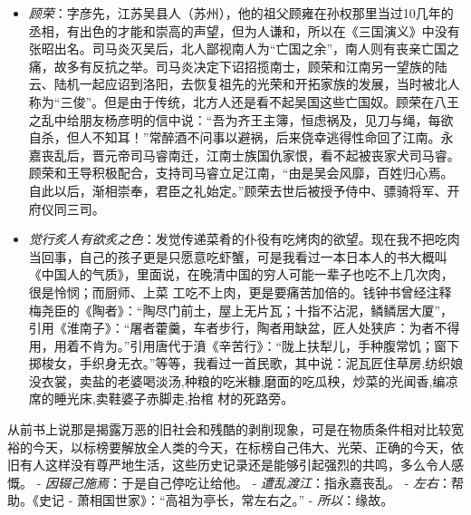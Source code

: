 \documentclass[]{book}
\providecommand{\tightlist}{%
  \setlength{\itemsep}{0pt}\setlength{\parskip}{0pt}}
\begin{document}
\begin{itemize}
\tightlist
\item
  \emph{顾荣}：字彦先，江苏吴县人（苏州），他的祖父顾雍在孙权那里当过10几年的丞相，有出色的才能和崇高的声望，但为人谦和，所以在《三国演义》中没有张昭出名。司马炎灭吴后，北人鄙视南人为``亡国之余''，南人则有丧亲亡国之痛，故多有反抗之举。司马炎决定下诏招揽南士，顾荣和江南另一望族的陆云、陆机一起应诏到洛阳，去恢复祖先的光荣和开拓家族的发展，当时被北人称为``三俊''。但是由于传统，北方人还是看不起吴国这些亡国奴。顾荣在八王之乱中给朋友杨彦明的信中说：``吾为齐王主簿，恒虑祸及，见刀与绳，每欲自杀，但人不知耳！''常醉酒不问事以避祸，后来侥幸逃得性命回了江南。永嘉丧乱后，晋元帝司马睿南迁，江南士族国仇家恨，看不起被丧家犬司马睿。顾荣和王导积极配合，支持司马睿立足江南，``由是吴会风靡，百姓归心焉。自此以后，渐相崇奉，君臣之礼始定。''顾荣去世后被授予侍中、骠骑将军、开府仪同三司。
\item
  \emph{觉行炙人有欲炙之色}：发觉传递菜肴的仆役有吃烤肉的欲望。现在我不把吃肉当回事，自己的孩子更是只愿意吃虾蟹，可是我看过一本日本人的书大概叫《中国人的气质》，里面说，在晚清中国的穷人可能一辈子也吃不上几次肉，很是怜悯；而厨师、上菜
  工吃不上肉，更是要痛苦加倍的。钱钟书曾经注释梅尧臣的《陶者》：``陶尽门前土，屋上无片瓦；十指不沾泥，鳞鳞居大厦''，引用《淮南子》：``屠者藿羹，车者步行，陶者用缺盆，匠人处狭庐：为者不得用，用着不肯为。''引用唐代于濆《辛苦行》：``陇上扶犁儿，手种腹常饥；窗下掷梭女，手织身无衣。''等等，我看过一首民歌，其中说：泥瓦匠住草房,纺织娘没衣裳，卖盐的老婆喝淡汤,种粮的吃米糠,磨面的吃瓜秧，炒菜的光闻香,编凉席的睡光床,卖鞋婆子赤脚走,抬棺
  材的死路旁。
\end{itemize}

从前书上说那是揭露万恶的旧社会和残酷的剥削现象，可是在物质条件相对比较宽裕的今天，以标榜要解放全人类的今天，在标榜自己伟大、光荣、正确的今天，依旧有人这样没有尊严地生活，这些历史记录还是能够引起强烈的共鸣，多么令人感慨。
- \emph{因辍己施焉}：于是自己停吃让给他。 -
\emph{遭乱渡江}：指永嘉丧乱。 - \emph{左右}：帮助。《史记 -
萧相国世家》：``高祖为亭长，常左右之。'' - \emph{所以}：缘故。
\end{document}
